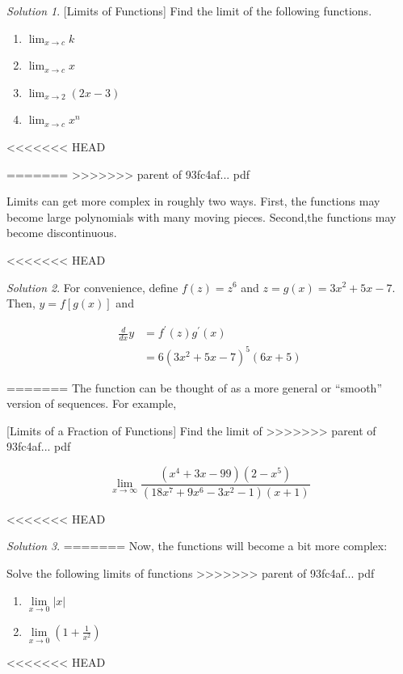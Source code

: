 \documentclass[]{book}
\providecommand{\tightlist}{%
  \setlength{\itemsep}{0pt}\setlength{\parskip}{0pt}}
\theoremstyle{definition}
\theoremstyle{definition}
\theoremstyle{definition}
\theoremstyle{remark}
\newtheorem*{solution}{Solution}
\begin{document}
\begin{solution}
[Limits of Functions]
\protect\hypertarget{exm:limfun1}{}{\label{exm:limfun1} {} }Find the limit of the following functions.

\begin{enumerate}
\def\labelenumi{\arabic{enumi}.}
\tightlist
\item
  \(\lim_{x \to c} k\)
\item
  \(\lim_{x \to c} x\)
\item
  \(\lim_{x\to 2} (2x-3)\)
\item
  \(\lim_{x \to c} x^n\)
\end{enumerate}
<<<<<<< HEAD
\end{solution}
=======
>>>>>>> parent of 93fc4af... pdf

Limits can get more complex in roughly two ways. First, the functions may become large polynomials with many moving pieces. Second,the functions may become discontinuous.

<<<<<<< HEAD
\begin{solution}
{}For convenience, define \(f(z) = z^6\) and \(z = g(x) = 3x^2+5x-7\). Then, \(y=f[g(x)]\) and

\begin{align*}
\frac{d}{dx}y&= f^\prime(z) g^\prime(x) \\
&= 6(3x^2+5x-7)^5 (6x + 5)
\end{align*}
\end{solution}
=======
The function can be thought of as a more general or ``smooth'' version of sequences. For example,

[Limits of a Fraction of Functions]
\protect\hypertarget{exr:limfunmax}{}{\label{exr:limfunmax} {} }
Find the limit of
>>>>>>> parent of 93fc4af... pdf

\[\lim_{x\to\infty} \frac{(x^4 +3x−99)(2−x^5)}{(18x^7 +9x^6 −3x^2 −1)(x+1)}\]

<<<<<<< HEAD
\begin{solution}
{}
=======
Now, the functions will become a bit more complex:

\protect\hypertarget{exr:discontlim}{}{\label{exr:discontlim} }Solve the following limits of functions
>>>>>>> parent of 93fc4af... pdf

\begin{enumerate}
\def\labelenumi{\arabic{enumi}.}
\tightlist
\item
  \(\lim\limits_{x\to 0} |x|\)
\item
  \(\lim\limits_{x\to 0} \left(1+\frac{1}{x^2}\right)\)
\end{enumerate}
<<<<<<< HEAD
\end{solution}
\end{document}

